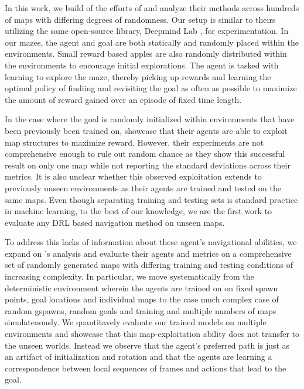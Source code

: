 
In this work, we build of the efforts of \cite{MiPaViICLR2017} and analyze their methods across hundreds of maps with differing degrees of randomness. 
Our setup is similar to theirs utilizing the same open-source library, Deepmind Lab \cite{BeLeTeARXIV2016}, for experimentation. In our mazes, the agent and goal are both statically and randomly placed within the environments. Small reward based apples are also randomly distributed within the environments to encourage initial explorations. The agent is tasked with learning to explore the maze, thereby picking up rewards and learning the optimal policy of findiing and revisiting the goal as often as possible to maximize the amount of reward gained over an episode of fixed time length.

In the case where the goal is randomly initialized within environments that have been previously been trained on, \cite{MiPaViICLR2017} showcase that their agents are able to exploit map structures to maximize reward. However, their experiments are not comprehensive enough to rule out random chance as they show this successful result on only one map while not reporting the standard deviations across their metrics. It is also unclear whether this observed exploitation extends to previously unseen environments as their agents are trained and tested on the same maps. Even though separating training and testing sets is standard practice in machine learning, to the best of our knowledge, we are the first work to evaluate any DRL based navigation method on unseen maps. 

To address this lacks of information about these agent's navigational abilities, we expand on \cite{MiPaViICLR2017}'s analysis and evaluate their agents and  metrics on a comprehensive set of randomly generated maps with differing training and testing conditions of increasing complexity. In particular, we move systematically from the deterministic environment wherein the agents are trained on on fixed spawn points, goal locations and individual maps to the case much complex case of random gspawns, random goals and training and multiple numbers of maps simulatenously. We quantitavely evaluate our trained models on multiple environments and showcase that this map-exploitation ability does not transfer to the unseen worlds. Instead we observe that the agent's preferred path is just as an artifact of initialization and rotation and that the agents are learning a correspondence between local sequences of frames and actions that lead to the goal.

